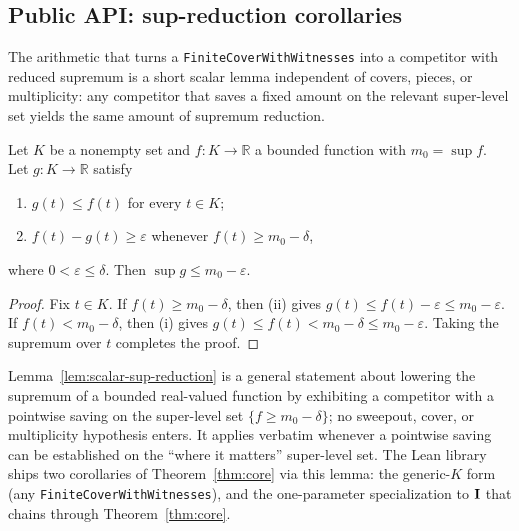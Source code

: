 \subsection{Public API: sup-reduction corollaries}
\label{sec:app-spec}

The arithmetic that turns a
\texttt{Finite\discretionary{-}{}{}Cover\discretionary{-}{}{}With\discretionary{-}{}{}Witnesses}
into a competitor with reduced supremum is a short scalar lemma
independent of covers, pieces, or multiplicity: any competitor
that saves a fixed amount on the relevant super-level set yields
the same amount of supremum reduction.

\begin{lemma}
\label{lem:scalar-sup-reduction}
Let $K$ be a nonempty set and $f : K \to \mathbb{R}$ a bounded
function with $m_0 = \sup f$. Let $g : K \to \mathbb{R}$ satisfy
\begin{enumerate}
\item[(i)] $g(t) \le f(t)$ for every $t \in K$;
\item[(ii)] $f(t) - g(t) \ge \varepsilon$ whenever
      $f(t) \ge m_0 - \delta$,
\end{enumerate}
where $0 < \varepsilon \le \delta$. Then
$\sup g \le m_0 - \varepsilon$.
\end{lemma}

\begin{proof}
Fix $t \in K$. If $f(t) \ge m_0 - \delta$, then (ii) gives
$g(t) \le f(t) - \varepsilon \le m_0 - \varepsilon$. If
$f(t) < m_0 - \delta$, then (i) gives $g(t) \le f(t) <
m_0 - \delta \le m_0 - \varepsilon$. Taking the supremum over
$t$ completes the proof.
\end{proof}

Lemma~\ref{lem:scalar-sup-reduction} is a general statement
about lowering the supremum of a bounded real-valued function by
exhibiting a competitor with a pointwise saving on the
super-level set $\{f \ge m_0 - \delta\}$; no sweepout, cover, or
multiplicity hypothesis enters. It applies verbatim whenever a
pointwise saving can be established on the ``where it matters''
super-level set. The Lean library ships two corollaries of
Theorem~\ref{thm:core} via this lemma: the generic-$K$ form (any
\texttt{FiniteCoverWithWitnesses}), and the one-parameter
specialization to $\mathbf{I}$ that chains through
Theorem~\ref{thm:core}.

